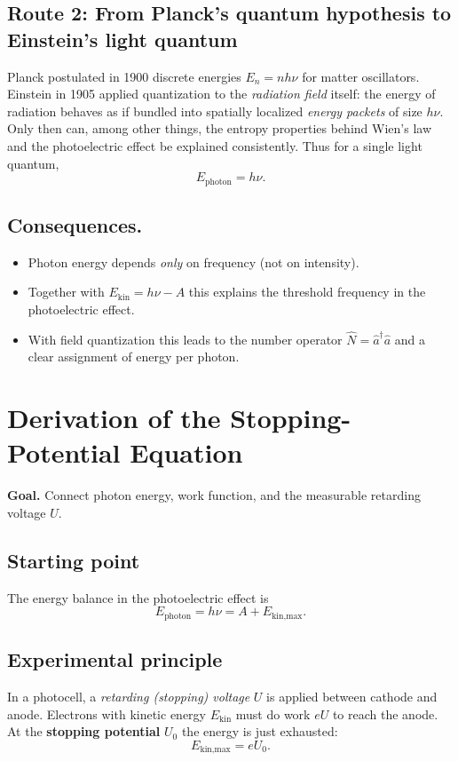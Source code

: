 \subsection*{Route 2: From Planck’s quantum hypothesis to Einstein’s light quantum}
Planck postulated in 1900 discrete energies \(E_n=n h\nu\) for matter oscillators. 
Einstein in 1905 applied quantization to the \emph{radiation field} itself: the energy of radiation behaves as if bundled into spatially localized \emph{energy packets} of size \(h\nu\). 
Only then can, among other things, the entropy properties behind Wien’s law and the photoelectric effect be explained consistently. 
Thus for a single light quantum,
\[
E_{\text{photon}} = h\nu .
\]

\subsection*{Consequences.}
\begin{itemize}
	\item Photon energy depends \emph{only} on frequency (not on intensity). 
	\item Together with \(E_{\text{kin}}=h\nu-A\) this explains the threshold frequency in the photoelectric effect. 
	\item  With field quantization this leads to the number operator \(\hat N=\hat a^\dagger \hat a\) and a clear assignment of energy per photon.
\end{itemize}


\section{Derivation of the Stopping-Potential Equation}
\label{anhangA:stoppspannung}

\textbf{Goal.} Connect photon energy, work function, and the measurable retarding voltage \(U\).

\subsection*{Starting point}
The energy balance in the photoelectric effect is
\[
E_{\text{photon}} = h\nu = A + E_{\text{kin,max}}.
\]

\subsection*{Experimental principle}
In a photocell, a \emph{retarding (stopping) voltage} \(U\) is applied between cathode and anode.  
Electrons with kinetic energy \(E_{\text{kin}}\) must do work \(eU\) to reach the anode.  
At the \textbf{stopping potential} \(U_0\) the energy is just exhausted:
\[
E_{\text{kin,max}} = eU_0.
\]

